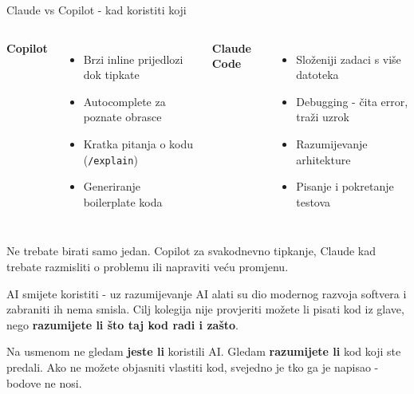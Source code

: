 \begin{frame}{Claude vs Copilot - kad koristiti koji}
\begin{columns}[T]
\textbf{Copilot}
\begin{itemize}
  \item Brzi inline prijedlozi dok tipkate
  \item Autocomplete za poznate obrasce
  \item Kratka pitanja o kodu (\texttt{/explain})
  \item Generiranje boilerplate koda
\end{itemize}

\textbf{Claude Code}
\begin{itemize}
  \item Složeniji zadaci s više datoteka
  \item Debugging - čita error, traži uzrok
  \item Razumijevanje arhitekture
  \item Pisanje i pokretanje testova
\end{itemize}
\end{columns}

\vspace{0.6em}
Ne trebate birati samo jedan. Copilot za svakodnevno tipkanje, Claude kad trebate razmisliti o problemu ili napraviti veću promjenu.
\end{frame}

\begin{frame}{AI smijete koristiti - uz razumijevanje}
AI alati su dio modernog razvoja softvera i zabraniti ih nema smisla. Cilj kolegija nije provjeriti možete li pisati kod iz glave, nego \textbf{razumijete li što taj kod radi i zašto}.

\vspace{0.6em}
Na usmenom ne gledam \textbf{jeste li} koristili AI. Gledam \textbf{razumijete li} kod koji ste predali. Ako ne možete objasniti vlastiti kod, svejedno je tko ga je napisao - bodove ne nosi.
\end{frame}

